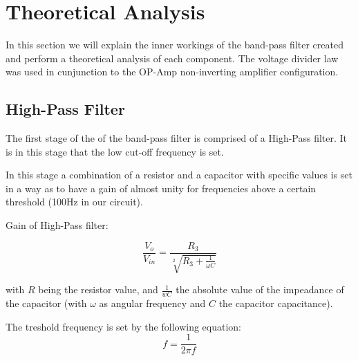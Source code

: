 
\section{Theoretical Analysis}
\label{sec:analysis}



In this section we will explain the inner workings of the band-pass filter created and perform a theoretical analysis of each component. 
The voltage divider law was used in cunjunction to the OP-Amp non-inverting amplifier configuration. 


\subsection{High-Pass Filter}
\label{subsec:transf}

The first stage of the of the band-pass filter is comprised of a High-Pass filter. It is in this stage that the low cut-off frequency is set.

In this stage a combination of a resistor and a capacitor with specific values is set in a way as to have a gain of almost unity for frequencies above a certain threshold (100Hz in our circuit).

Gain of High-Pass filter:

\[
\frac{V_o}{V_{in}} = \frac{R_3}{\sqrt[2]{R_3+\frac{1}{\omega C}}}
\]

with \(R\) being the resistor value, and \(\frac{1}{wC}\) the absolute value of the impeadance of the capacitor (with \(\omega\) as angular frequency and \(C\) the capacitor capacitance).

The treshold frequency is set by the following equation:
\[
f = \frac{1}{2\pi f}
\]

